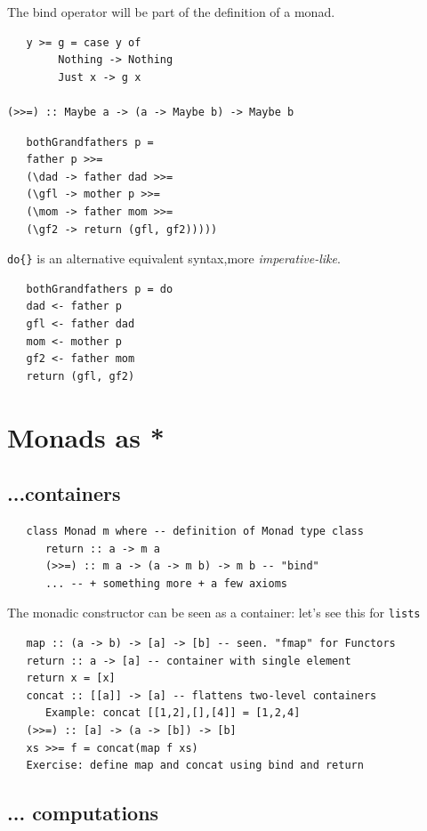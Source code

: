 The bind operator will be part of the definition
of a monad.

\begin{lstlisting}
   y >= g = case y of
        Nothing -> Nothing
        Just x -> g x

(>>=) :: Maybe a -> (a -> Maybe b) -> Maybe b
\end{lstlisting}

\begin{lstlisting}
   bothGrandfathers p =
   father p >>= 
   (\dad -> father dad >>= 
   (\gfl -> mother p >>= 
   (\mom -> father mom >>= 
   (\gf2 -> return (gfl, gf2)))))
\end{lstlisting}
   
\lstinline|do{}| is an alternative equivalent syntax,more \textit{imperative-like}.
\begin{lstlisting}
   bothGrandfathers p = do
   dad <- father p
   gfl <- father dad
   mom <- mother p
   gf2 <- father mom
   return (gfl, gf2)
\end{lstlisting}

\section{Monads as *}
\subsection{...containers}
\begin{lstlisting}
   class Monad m where -- definition of Monad type class
      return :: a -> m a
      (>>=) :: m a -> (a -> m b) -> m b -- "bind"
      ... -- + something more + a few axioms
\end{lstlisting}

The monadic constructor can be seen as a container:
let’s see this for \lstinline|lists|

\begin{lstlisting}
   map :: (a -> b) -> [a] -> [b] -- seen. "fmap" for Functors
   return :: a -> [a] -- container with single element
   return x = [x]
   concat :: [[a]] -> [a] -- flattens two-level containers
      Example: concat [[1,2],[],[4]] = [1,2,4]
   (>>=) :: [a] -> (a -> [b]) -> [b]
   xs >>= f = concat(map f xs)
   Exercise: define map and concat using bind and return
\end{lstlisting}

\subsection{... computations}

